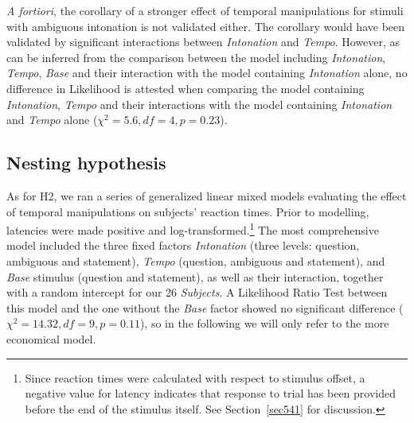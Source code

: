 \textit{A fortiori}, the corollary of a stronger effect of temporal manipulations for stimuli with ambiguous intonation is not validated either. The corollary would have been validated by significant interactions between \textit{Intonation} and \textit{Tempo}. However, as can be inferred from the comparison between the model including \textit{Intonation}, \textit{Tempo}, \textit{Base} and their interaction with the model containing \textit{Intonation} alone, no difference in Likelihood is attested when comparing the model containing \textit{Intonation}, \textit{Tempo} and their interactions with the model containing \textit{Intonation} and \textit{Tempo} alone ($\chi^{2}=5.6, df=4, p=0.23$).

\subsection{Nesting hypothesis}\label{sec532}
As for H2, we ran a series of generalized linear mixed models evaluating the effect of temporal manipulations on subjects' reaction times. Prior to modelling, latencies were made positive and log-transformed.\footnote{Since reaction times were calculated with respect to stimulus offset, a negative value for latency indicates that response to trial has been provided before the end of the stimulus itself. See Section~\ref{sec541} for discussion.} The most comprehensive model included the three fixed factors \textit{Intonation} (three levels: question, ambiguous and statement), \textit{Tempo} (question, ambiguous and statement), and \textit{Base} stimulus (question and statement), as well as their interaction, together with a random intercept for our 26 \textit{Subjects}. A Likelihood Ratio Test between this model and the one without the \textit{Base} factor showed no significant difference ($\chi^{2}=14.32, df=9, p=0.11$), so in the following we will only refer to the more economical model. 

